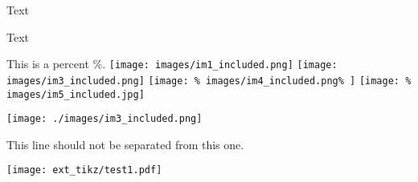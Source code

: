 
Text

Text%


This is a percent \%.
\texttt{[image: images/im1\_included.png]}
\texttt{[image: images/im3\_included.png]}
\texttt{[image: \%
  images/im4\_included.png\%
  ]}
\texttt{[image: \%
  images/im5\_included.jpg]}

\texttt{[image: ./images/im3\_included.png]}

This line should not be separated
%
from this one.

\newif\ifvar

\ifvar
\fi




\texttt{[image: ext\_tikz/test1.pdf]}







